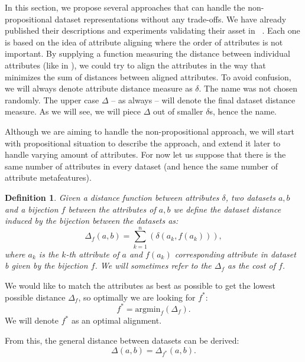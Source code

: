 \documentclass{article}
\newtheorem{definition}{Definition}
\newcommand{\attributeDistance}{\delta}
\newcommand{\globalDistance}{\Delta}
\begin{document}
\begin{refsegment}
In this section, we propose several approaches that can handle the non-propositional dataset representations without any trade-offs. We have already published their descriptions and experiments validating their asset in ~\cite{diplomka,jaIcannga2013,SSCI2014,jaCEC2015,jaSSCI2015}. Each one is based on the idea of attribute aligning where the order of attributes is not important. By supplying a function measuring the distance between individual attributes (like in \cite{RepresentationalIssuesInMetalearning}), we could try to align the attributes in the way that minimizes the sum of distances between aligned attributes. To avoid confusion, we will always denote attribute distance measure as $\attributeDistance$. The name was not chosen randomly. The upper case $\globalDistance$ -- as always -- will denote the final dataset distance measure. As we will see, we will piece $\globalDistance$ out of smaller $\attributeDistance$s, hence the name.

Although we are aiming to handle the non-propositional approach, we will start with propositional situation to describe the approach, and extend it later to handle varying amount of attributes.
For now let us suppose that there is the same number of attributes in every dataset (and hence the same number of attribute metafeatures).

\begin{definition}
	Given a distance function between attributes $\attributeDistance$, two datasets $a,b$ and a bijection $f$ between the attributes of $a,b$ we define the dataset distance induced by the bijection between the datasets as:
	\begin{equation}
	\globalDistance_f(a,b)=\sum_{k=1}^{n}{(\attributeDistance(a_k,f(a_k)))},
	\label{eq:attdist}
	\end{equation}
	where $a_k$ is the $k$-th attribute of $a$ and $f(a_k)$ corresponding attribute in dataset b given by the bijection $f$.
	We will sometimes refer to the $\globalDistance_f$ as the \emph{cost} of $f$.
\end{definition}
We would like to match the attributes as best as possible to get the lowest possible distance $\globalDistance_f$, so optimally we are looking for $f^*$:
\begin{equation}
f^*= \mathrm{argmin}_f(\globalDistance_f).
\label{eq:argmin}
\end{equation}
We will denote $f^*$ as an optimal alignment.

From this, the general distance between datasets can be derived:
\begin{equation}
\globalDistance(a,b) = \globalDistance_{f^*}(a,b).
\end{equation}


\end{refsegment}
\end{document}
